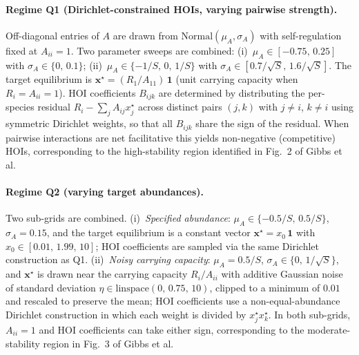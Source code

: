 \documentclass[pdflatex,sn-mathphys-num]{sn-jnl}%
\begin{document}
\begin{appendices}
\paragraph{Regime Q1 (Dirichlet-constrained HOIs, varying pairwise strength).}
Off-diagonal entries of $A$ are drawn from $\mathrm{Normal}(\mu_A, \sigma_A)$ with self-regulation fixed at $A_{ii} = 1$. Two parameter sweeps are combined: (i)~$\mu_A \in [-0.75,\, 0.25]$ with $\sigma_A \in \{0,\, 0.1\}$; (ii)~$\mu_A \in \{-1/S,\, 0,\, 1/S\}$ with $\sigma_A \in [0.7/\!\sqrt{S},\, 1.6/\!\sqrt{S}]$. The target equilibrium is $\mathbf{x}^\star = (R_1/A_{11})\,\mathbf{1}$ (unit carrying capacity when $R_i = A_{ii} = 1$). HOI coefficients $B_{ijk}$ are determined by distributing the per-species residual $R_i - \sum_j A_{ij} x^\star_j$ across distinct pairs $(j,k)$ with $j \neq i$, $k \neq i$ using symmetric Dirichlet weights, so that all $B_{ijk}$ share the sign of the residual. When pairwise interactions are net facilitative this yields non-negative (competitive) HOIs, corresponding to the high-stability region identified in Fig.~2 of Gibbs et al.

\paragraph{Regime Q2 (varying target abundances).}
Two sub-grids are combined. (i)~\emph{Specified abundance}: $\mu_A \in \{-0.5/S,\, 0.5/S\}$, $\sigma_A = 0.15$, and the target equilibrium is a constant vector $\mathbf{x}^\star = x_0\,\mathbf{1}$ with $x_0 \in [0.01,\, 1.99,\, 10]$; HOI coefficients are sampled via the same Dirichlet construction as Q1. (ii)~\emph{Noisy carrying capacity}: $\mu_A = 0.5/S$, $\sigma_A \in \{0,\, 1/\!\sqrt{S}\}$, and $\mathbf{x}^\star$ is drawn near the carrying capacity $R_i / A_{ii}$ with additive Gaussian noise of standard deviation $\eta \in \mathrm{linspace}(0,\, 0.75,\, 10)$, clipped to a minimum of $0.01$ and rescaled to preserve the mean; HOI coefficients use a non-equal-abundance Dirichlet construction in which each weight is divided by $x^\star_j x^\star_k$. In both sub-grids, $A_{ii} = 1$ and HOI coefficients can take either sign, corresponding to the moderate-stability region in Fig.~3 of Gibbs et al.


\end{appendices}
\end{document}
